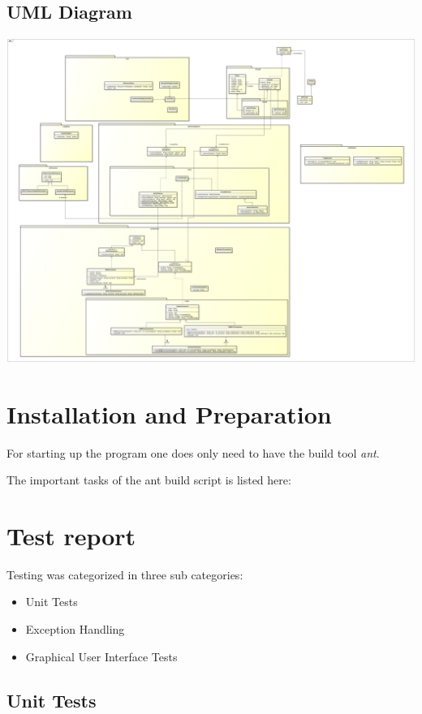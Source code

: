 \documentclass[11pt, a4paper]{article}
\begin{document}
\subsection{UML Diagram}
\includegraphics[width=\textwidth]{images/umlv3}

\newpage

\section{Installation and Preparation}

For starting up the program one does only need to have the build tool \textit{ant}. 

The important tasks of the ant build script is listed here:

\section{Test report}

Testing was categorized in three sub categories:

\begin{itemize}
	\item Unit Tests
	\item Exception Handling
	\item Graphical User Interface Tests
\end{itemize}

\subsection{Unit Tests}
\end{document}
